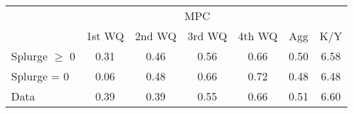 \begin{tabular}{@{}lcccccc@{}} 
\toprule 
                  & \multicolumn{5}{c}{MPC} &   \\   
                  &  1st WQ  & 2nd WQ  & 3rd WQ & 4th WQ  & Agg  &  K/Y  \\  \midrule 
Splurge $\geq$ 0 &0.31 & 0.46 & 0.56 & 0.66 & 0.50 & 6.58 \\ 
Splurge = 0 &0.06 & 0.48 & 0.66 & 0.72 & 0.48 & 6.48 \\ 
Data &0.39 & 0.39 & 0.55 & 0.66 & 0.51 & 6.60 \\ 
\end{tabular}  
